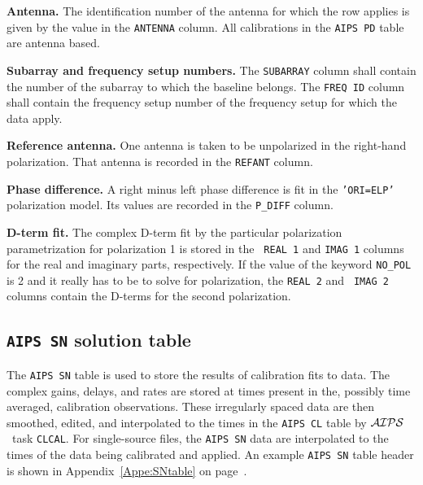 \documentclass[twoside]{article}
\newcommand{\AIPS}{{$\cal AIPS\/$}}
\begin{document}
{\bf Antenna.} The identification number of the antenna for which the
row applies is given by the value in the {\tt ANTENNA} column.  All
calibrations in the {\tt AIPS PD} table are antenna based.

{\bf Subarray  and frequency setup numbers.} The {\tt SUBARRAY} column
shall contain the number of the subarray to which the baseline belongs.
The {\tt FREQ ID} column shall contain the frequency setup number of
the frequency setup for which the data apply.

{\bf Reference antenna.} One antenna is taken to be unpolarized in the
right-hand polarization.  That antenna is recorded in the {\tt REFANT}
column.

{\bf Phase difference.} A right minus left phase difference is fit
in the {\tt 'ORI=ELP'} polarization model.  Its values are recorded in
the {\tt P\_DIFF} column.

{\bf D-term fit.} The complex D-term fit by the particular
polarization parametrization for polarization 1 is stored in the {\tt
  REAL 1} and {\tt IMAG 1} columns for the real and imaginary parts,
respectively.  If the value of the keyword {\tt NO\_POL} is 2 and it
really has to be to solve for polarization, the {\tt REAL 2} and {\tt
  IMAG 2} columns contain the D-terms for the second polarization.

\vfill\eject
\subsection{{\tt AIPS SN} solution table}
\label{s:SN}

The {\tt AIPS SN} table is used to store the results of calibration
fits to data.  The complex gains, delays, and rates are stored at
times present in the, possibly time averaged, calibration
observations.  These irregularly spaced data are then smoothed,
edited, and interpolated to the times in the {\tt AIPS CL} table by
\AIPS\ task {\tt CLCAL}\@.  For single-source files, the {\tt AIPS SN}
data are interpolated to the times of the data being calibrated and
applied.  An example {\tt AIPS SN} table header is shown in
Appendix~\ref{Appe:SNtable} on page~\pageref{Appe:SNtable}.
\end{document}
